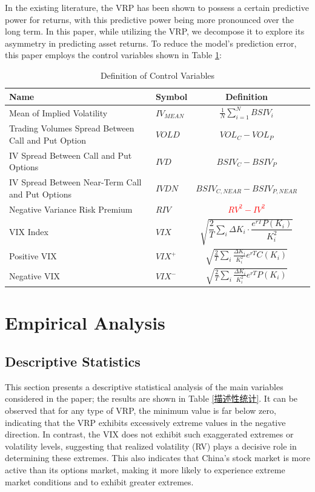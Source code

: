 \documentclass[a4paper, 12pt]{article}    %
\begin{document}
        In the existing literature, the VRP has been shown to possess a certain predictive power for returns, with this predictive power being more pronounced over the long term. In this paper, while utilizing the VRP, we decompose it to explore its asymmetry in predicting asset returns.
        To reduce the model’s prediction error, this paper employs the control variables shown in Table \ref{variables}:
        
	\begin{table}[H]
		\centering
		\caption{Definition of Control Variables}
		\label{variables}
		\renewcommand{\arraystretch}{1.3} %
		\begin{tabular}{llcp{7.5cm}}
			\toprule
			\textbf{Name} & \textbf{Symbol} & \textbf{Definition} \\
			\midrule
			Mean of Implied Volatility & $IV_{MEAN}$ & $\frac{1}{N}\sum_{i=1}^N BSIV_i$ \\
			Trading Volumes Spread Between Call and Put Option  & $VOLD$ & $VOL_{C}-VOL_{P}$ \\
			 IV Spread Between Call and Put Options & $IVD$ & $BSIV_{C}-BSIV_{P}$ \\
			    IV Spread Between Near-Term Call and Put Options & $IVDN$ & $BSIV_{C,NEAR}-BSIV_{P,NEAR}$ \\
			Negative Variance Risk Premium & $RIV$ & \textcolor{red}{$RV^2-IV^2$} \\
			 VIX Index & $VIX$ & $\sqrt{\dfrac{2}{T}\sum\limits_{i}\Delta K_i \cdot \dfrac{e^{rT}P(K_i)}{K_i^2}}$ \\
			 Positive VIX & $VIX^+$ & $\sqrt{\displaystyle\frac{2}{T}\sum\limits_{i}\frac{\Delta K_i}{K_i^2}e^{rT}C(K_i)}$ \\
		Negative VIX & $VIX^-$ & $\sqrt{\displaystyle\frac{2}{T}\sum\limits_{i}\frac{\Delta K_i}{K_i^2}e^{rT}P(K_i)}$ \\
			\bottomrule
		\end{tabular}
	\end{table}


    
\section{Empirical Analysis}
\subsection{Descriptive Statistics}
This section presents a descriptive statistical analysis of the main variables considered in the paper; the results are shown in Table \ref{描述性统计}. It can be observed that for any type of VRP, the minimum value is far below zero, indicating that the VRP exhibits excessively extreme values in the negative direction. In contrast, the VIX does not exhibit such exaggerated extremes or volatility levels, suggesting that realized volatility (RV) plays a decisive role in determining these extremes. This also indicates that China’s stock market is more active than its options market, making it more likely to experience extreme market conditions and to exhibit greater extremes.
\end{document}
